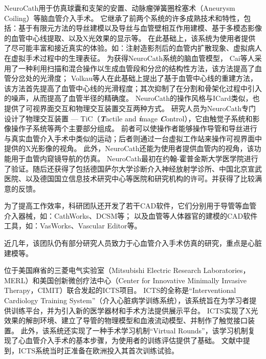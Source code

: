 NeuroCath用于仿真球囊和支架的安置、动脉瘤弹簧圈栓塞术（Aneurysm Coiling）等脑血管介入手术。
它继承了前两个系统的许多成熟技术和特性，包括：基于有限元方法的导丝建模以及导丝与血管壁相互作用建模\cite{Wang1996daVinci}\cite{Chui1996daVinci}、基于多模态影像的血管中心线提取\cite{Wang1998ICard}、以及X光效果的显示\cite{Wang1998aICard}\cite{Wang1998ICard}等。
在此基础上，该系统为使用者提供了尽可能丰富和接近真实的体验。如：注射造影剂后的血管内扩散现象、虚拟病人在虚拟手术过程中的生理表征。
为获得NeuroCath系统的脑血管模型，
Cai等人\cite{Ye2002Vessel}\cite{Cai2003aVessel}\cite{Cai2003Vessel}采用了一种利用扫描和混合操作以生成血管段和分岔的结构性方法，该方法提高了血管分岔处的光滑度；
Volkau等人\cite{Volkau2005Vessel}\cite{Volkau2008Vessel}在此基础上提出了基于血管中心线的重建方法，该方法首先提高了血管中心线的光滑程度；其次抑制了在分割和骨架化过程中引入的噪声，从而提高了血管半径的精确度。
NeuroCath的操作风格与ICard类似，也提供了可视界面交互和物理交互装置交互两种方式\cite{Nowinski2001NeuroCath}。
研究人员为NeuroCath专门设计了物理交互装置 --- TiC（\textbf{\textit{T}}actile and \textbf{\textit{i}}mage \textbf{\textit{C}}ontrol）\cite{Chui1999TiC}\cite{Ma1999TiC}，它由触觉子系统和影像操作子系统等两个主要部分组成。
前者可以使操作者能够操作导管和导丝进行与真实血管介入手术中类似的运动；后者则通过一台虚拟工作站来操作可视界面中提供的X光影像的视角。
此外，NeuroCath还能为使用者提供血管内的视角，该功能用于血管内窥镜导航的仿真\cite{Nowinski2001NeuroCath}。
NeuroCath最初在约翰-霍普金斯大学医学院进行了验证。随后还获得了包括德国萨尔大学诊断介入神经放射学诊所、中国北京宣武医院、以及德国国立信息技术研究中心等医院和研究机构的许可。并获得了比较满意的反馈\cite{Ma2007NeuroCath}。

为了提高工作效率，科研团队还开发了若干CAD软件，它们分别用于导管等血管介入器械，如：CathWorks\cite{Cai1998CathWorks}\cite{Cai2000CathWorks}、DCSM\cite{Li2001DCSM}等； 以及血管等人体器官的建模的CAD软件工具，如：VasWorks\cite{Cai2003Vessel}、Vascular Editor\cite{Ma2007NeuroCath}等。

近几年，该团队仍有部分研究人员致力于心血管介入手术仿真的研究，重点是心脏建模\cite{Chiang2011}\cite{Chiang2012}等。

位于美国麻省的三菱电气实验室（Mitsubishi Electric Research Laboratories，MERL）\cite{merlweb}和美国创新微创疗法中心（Center for Innovative Minimally Invasive Therapy，CIMIT）\cite{cimitweb}联合发起的ICTS项目\cite{Dawson2000ICTS}\cite{Cotin2000ICTS}\cite{Shaffer1999ICTS}。
ICTS的全称是“Interventional Cardiology Training System”（介入心脏病学训练系统），该系统旨在为学习者提供训练平台，并为引入新的医学器材和手术方法提供展示平台\cite{Cotin2000ICTS}。
ICTS实现了X光效果的解剖环境、建立了导管的物理模型和血液流动模型、并制作了触觉接口装置\cite{Cotin2000ICTS}。
此外，该系统还实现了一种手术学习机制“Virtual Rounds”\cite{Shaffer1999ICTS}，该学习机制复现了心血管介入手术的基本步骤，为使用者的训练评估提供了基础。
文献\cite{Dawson2000ICTS}中提到，ICTS系统当时正准备在欧洲投入其首次训练试验。

